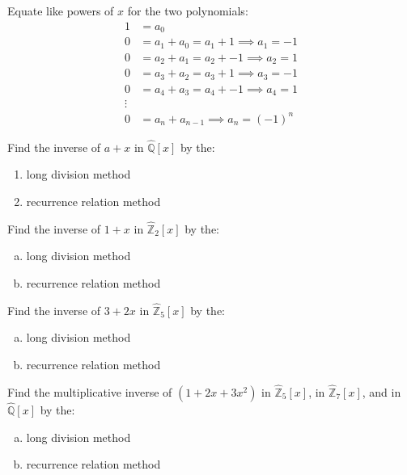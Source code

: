 \begin{example}
\begin{example}
\begin{enumerate}
Equate like powers of $x$ for the two polynomials:
\begin{align*}
1&=a_0\\
0&=a_1+a_0=a_1+1\implies a_1=-1\\
0&=a_2+a_1=a_2+-1\implies a_2=1\\
0&=a_3+a_2=a_3+1\implies a_3=-1\\
0&=a_4+a_3=a_4+-1\implies a_4=1\\
\vdots\\
0&=a_n+a_{n-1}\implies a_n=(-1)^n
\end{align*}
\end{enumerate}
\end{example}

\begin{exercise}
Find the inverse of $a+x$ in $\widehat{{\mathbb Q}}[x]$ by the:
\begin{enumerate}
\item long division method
\item recurrence relation method
\end{enumerate}
\end{exercise}

\begin{exercise}\label{exercise:rings:Z2x}
Find the inverse of $1+x$ in $ \widehat{{\mathbb Z}}_{2}[x]$ by the:
\begin{enumerate}[(a)]
\item long division method
\item recurrence relation method
\end{enumerate}
\end{exercise}

\begin{exercise}
Find the inverse of $3+2x$ in $ \widehat{{\mathbb Z}}_{5}[x]$ by the:
\begin{enumerate}[(a)]
\item long division method
\item recurrence relation method
\end{enumerate}
\end{exercise}

\begin{exercise}\label{exercise:rings:Z5x}
Find the multiplicative inverse of $(1+2x+3x^2)$ in $ \widehat{{\mathbb Z}}_5[x]$, in $ \widehat{{\mathbb Z}}_7[x]$, and in $ \widehat{{\mathbb Q}}[x]$ by the:
\begin{enumerate}[(a)]
\item long division method
\item recurrence relation method
\end{enumerate}
\end{exercise}
\end{example}

